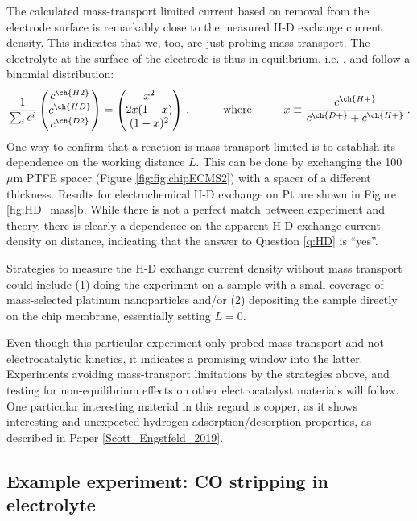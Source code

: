The calculated mass-transport limited current based on  removal from the electrode surface is remarkably close to the measured H-D exchange current density. This indicates that we, too, are just probing mass transport. The electrolyte at the surface of the electrode is thus in equilibrium, i.e. ,  and  follow a binomial distribution:
\begin{equation}
\frac{1}{\sum_i c^i}\begin{pmatrix}
c^{\ch{H2}}\\c^{\ch{HD}}\\c^{\ch{D2}}
\end{pmatrix}
= \begin{pmatrix}
x^2\\ 2x(1-x)\\ (1-x)^2
\end{pmatrix}\,,\hspace{1cm}\text{where}\hspace{1cm}
x \equiv \frac{c^{\ch{H+}}}{c^{\ch{D+}} + c^{\ch{H+}}}\,.
\end{equation}
One way to confirm that a reaction is mass transport limited is to establish its dependence on the working distance $L$. This can be done by exchanging the 100 $\mu$m PTFE spacer (Figure \ref{fig:fig:chipECMS2}) with a spacer of a different thickness. Results for electrochemical H-D exchange on Pt are shown in Figure \ref{fig:HD_mass}b. While there is not a perfect match between experiment and theory, there is clearly a dependence on the apparent H-D exchange current density on distance, indicating that the answer to Question \ref{q:HD} is ``yes''.

Strategies to measure the H-D exchange current density without mass transport could include (1) doing the experiment on a sample with a small coverage of mass-selected platinum nanoparticles and/or (2) depositing the sample directly on the chip membrane, essentially setting $L=0$.

Even though this particular experiment only probed mass transport and not electrocatalytic kinetics, it indicates a promising window into the latter. Experiments avoiding mass-transport limitations by the strategies above, and testing for non-equilibrium effects on other electrocatalyst materials will follow. One particular interesting material in this regard is copper, as it shows interesting and unexpected hydrogen adsorption/desorption properties, as described in Paper \ref{Scott_Engstfeld_2019}.


\subsection{Example experiment: CO stripping in  electrolyte}\label{subsec:isotope_CO2}

